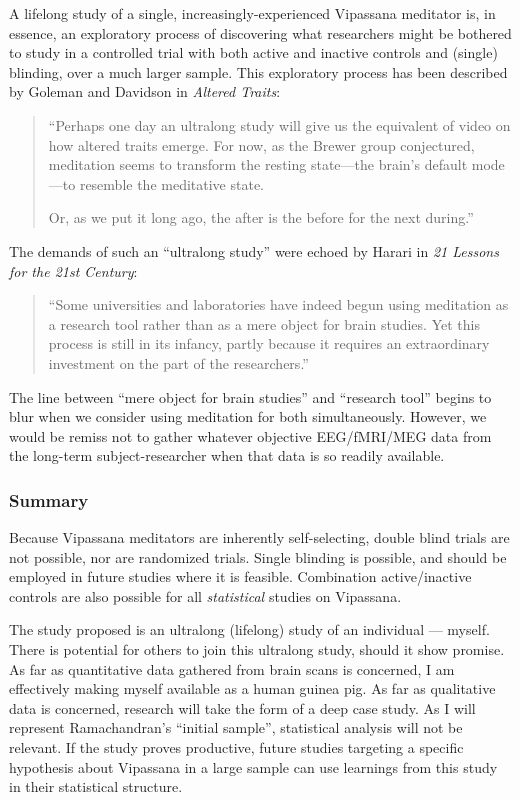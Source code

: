 \documentclass[a4paper, amsfonts, amssymb, amsmath, reprint, showkeys, nofootinbib, twoside]{revtex4-1}
\begin{document}
A lifelong study of a single, increasingly-experienced Vipassana meditator
is, in essence, an exploratory process of discovering what researchers might be
bothered to study in a controlled trial with both active and inactive controls and
(single) blinding, over a much larger sample. This exploratory process has been
described by Goleman and Davidson in \textit{Altered Traits}:

\begin{quotation}
  ``Perhaps one day an ultralong study will give us the equivalent of video on how
  altered traits emerge. For now, as the Brewer group conjectured, meditation seems
  to transform the resting state---the brain's default mode---to resemble the
  meditative state.

  Or, as we put it long ago, the after is the before for the next
  during.'' \cite{goleman2017altered}
\end{quotation}

The demands of such an ``ultralong study'' were echoed by Harari in \textit{21
  Lessons for the 21st Century}:

\begin{quotation}
  ``Some universities and laboratories have indeed begun using meditation as a
  research tool rather than as a mere object for brain studies. Yet this process is
  still in its infancy, partly because it requires an extraordinary investment on the
  part of the researchers.'' \cite{harari201821}
\end{quotation}

The line between ``mere object for brain studies'' and ``research tool'' begins to
blur when we consider using meditation for both simultaneously. However, we would be
remiss not to
gather whatever objective EEG/fMRI/MEG data from the long-term subject-researcher
when that data is so readily available.

\subsubsection{Summary}

Because Vipassana meditators are inherently self-selecting, double blind trials are not
possible, nor are randomized trials. Single blinding is possible, and should be
employed in future studies where it is feasible. Combination active/inactive controls
are also possible for all \textit{statistical} studies on Vipassana.

The study proposed is an ultralong (lifelong) study of an individual --- myself.
There is potential for others to join this ultralong study, should it show promise.
As far as quantitative data gathered from brain scans is concerned, I am effectively
making myself available as a human guinea pig. As far as qualitative data is
concerned, research will take the form of a deep case study. As I will represent
Ramachandran's ``initial sample'', statistical analysis will not be relevant.
If the study proves productive, future studies targeting a specific hypothesis about
Vipassana in a large sample can use learnings from this study in their statistical
structure.
\end{document}
